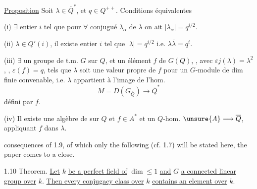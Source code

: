 \uline{Proposition} Soit $\lambda\in\overline Q^*$, et $q\in Q^{++}$. Conditions équivalentes

(i) $\exists$ entier $i$ tel que pour $\forall$ conjugué $\lambda_\alpha$ de $\lambda$ on ait $|\lambda_\alpha|=q^{i/2}$.


(ii) $\lambda\in Q'(i)$, il existe entier $i$ tel que $|\lambda|=q^{i/2}$ i.e. $\lambda\bar\lambda=q^i$.

(iii) $\exists$ un groupe de t.m. $G$ sur $Q$, et un élément $f$ de $G(Q)$,
,
avec $\varepsilon j(\lambda)=\lambda^2$,  , $\varepsilon(f)=q$, tels que $\lambda$ soit une valeur propre de $f$ pour un $G$-module de dim finie  convenable, i.e. $\lambda$ appartient à l'image de l'hom.
\[
M=D(G_{\overline Q})\longrightarrow\overline Q^*
\]
défini par $f$.

(iv) Il existe une algèbre de   sur $Q$ et $f\in A^*$  et un $Q$-hom. $\unsure{A}\longrightarrow\overline Q$, appliquant $f$ dans $\lambda$.




consequences of 1.9, of which only the following (cf. 1.7) will be stated here, the paper comes to a close.

1.10 Theorem. \uline{Let} $k$ \uline{be a perfect field of} $\dim\leq1$ \uline{and} $G$ \uline{a connected linear group over} $k$. \uline{Then every conjugacy class over} $k$ \uline{contains an element over} $k$.

